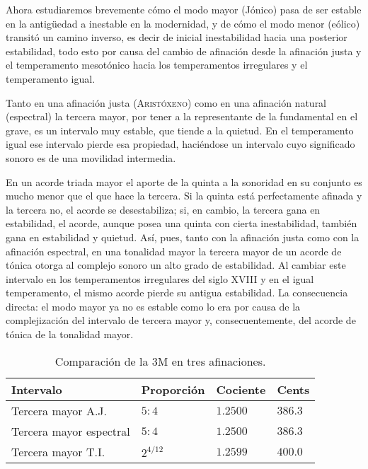 \documentclass[a4paper,10pt]{article}
\begin{document}
\begin{multicols}{2}
  Ahora estudiaremos brevemente cómo el modo mayor (Jónico) pasa de ser estable en la antigüedad a inestable en la modernidad, y de cómo el modo menor (eólico) transitó un camino inverso, es decir de inicial inestabilidad hacia una posterior estabilidad, todo esto por causa del cambio de afinación desde la afinación justa y el temperamento mesotónico hacia los temperamentos irregulares y el temperamento igual.

  Tanto en una afinación justa (\textsc{Aristóxeno}) como en una afinación natural (espectral) la tercera mayor, por tener a la representante de la fundamental en el grave, es un intervalo muy estable, que tiende a la quietud. En el temperamento igual ese intervalo pierde esa propiedad, haciéndose un intervalo cuyo significado sonoro es de una movilidad intermedia.

  En un acorde triada mayor el aporte de la quinta a la sonoridad en su conjunto es mucho menor que el que hace la tercera. Si la quinta está perfectamente afinada y la tercera no, el acorde se desestabiliza; si, en cambio, la tercera gana en estabilidad, el acorde, aunque posea una quinta con cierta inestabilidad, también gana en estabilidad y quietud. Así, pues, tanto con la afinación justa como con la afinación espectral, en una tonalidad mayor la tercera mayor de un acorde de tónica otorga al complejo sonoro un alto grado de estabilidad. Al cambiar este intervalo en los temperamentos irregulares del siglo XVIII y en el igual temperamento, el mismo acorde pierde su antigua estabilidad. La consecuencia directa: el modo mayor ya no es estable como lo era por causa de la complejización del intervalo de tercera mayor y, consecuentemente, del acorde de tónica de la tonalidad mayor.
\end{multicols}

\begin{table}[ht]
  \centering
  \caption{Comparación de la 3M en tres afinaciones.}\label{tab:3M}
  \begin{tabular}{@{}llll@{}}
  \toprule
  Intervalo               & Proporción  & Cociente  & Cents   \\ \midrule
  Tercera mayor A.J.      & $5:4$       & $1.2500$  & $386.3$ \\
  Tercera mayor espectral & $5:4$       & $1.2500$  & $386.3$ \\
  Tercera mayor T.I.      & $2^{4/12}$  & $1.2599$  & $400.0$ \\ \bottomrule
  \end{tabular}
\end{table}
\end{document}
